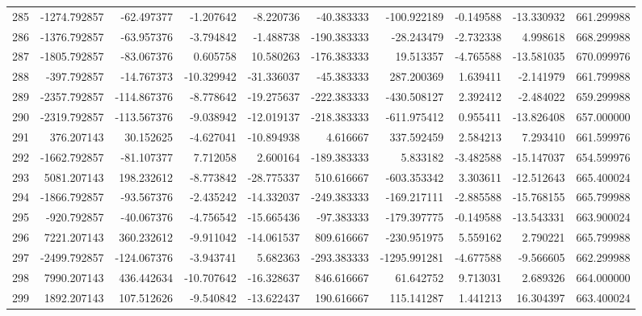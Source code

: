 \begin{tabular}{lrrrrrrrrr}
285 &  -1274.792857 &   -62.497377 &  -1.207642 &  -8.220736 &   -40.383333 &  -100.922189 &  -0.149588 & -13.330932 &  661.299988 \\
286 &  -1376.792857 &   -63.957376 &  -3.794842 &  -1.488738 &  -190.383333 &   -28.243479 &  -2.732338 &   4.998618 &  668.299988 \\
287 &  -1805.792857 &   -83.067376 &   0.605758 &  10.580263 &  -176.383333 &    19.513357 &  -4.765588 & -13.581035 &  670.099976 \\
288 &   -397.792857 &   -14.767373 & -10.329942 & -31.336037 &   -45.383333 &   287.200369 &   1.639411 &  -2.141979 &  661.799988 \\
289 &  -2357.792857 &  -114.867376 &  -8.778642 & -19.275637 &  -222.383333 &  -430.508127 &   2.392412 &  -2.484022 &  659.299988 \\
290 &  -2319.792857 &  -113.567376 &  -9.038942 & -12.019137 &  -218.383333 &  -611.975412 &   0.955411 & -13.826408 &  657.000000 \\
291 &    376.207143 &    30.152625 &  -4.627041 & -10.894938 &     4.616667 &   337.592459 &   2.584213 &   7.293410 &  661.599976 \\
292 &  -1662.792857 &   -81.107377 &   7.712058 &   2.600164 &  -189.383333 &     5.833182 &  -3.482588 & -15.147037 &  654.599976 \\
293 &   5081.207143 &   198.232612 &  -8.773842 & -28.775337 &   510.616667 &  -603.353342 &   3.303611 & -12.512643 &  665.400024 \\
294 &  -1866.792857 &   -93.567376 &  -2.435242 & -14.332037 &  -249.383333 &  -169.217111 &  -2.885588 & -15.768155 &  665.799988 \\
295 &   -920.792857 &   -40.067376 &  -4.756542 & -15.665436 &   -97.383333 &  -179.397775 &  -0.149588 & -13.543331 &  663.900024 \\
296 &   7221.207143 &   360.232612 &  -9.911042 & -14.061537 &   809.616667 &  -230.951975 &   5.559162 &   2.790221 &  665.799988 \\
297 &  -2499.792857 &  -124.067376 &  -3.943741 &   5.682363 &  -293.383333 & -1295.991281 &  -4.677588 &  -9.566605 &  662.299988 \\
298 &   7990.207143 &   436.442634 & -10.707642 & -16.328637 &   846.616667 &    61.642752 &   9.713031 &   2.689326 &  664.000000 \\
299 &   1892.207143 &   107.512626 &  -9.540842 & -13.622437 &   190.616667 &   115.141287 &   1.441213 &  16.304397 &  663.400024 \\

\end{tabular}
